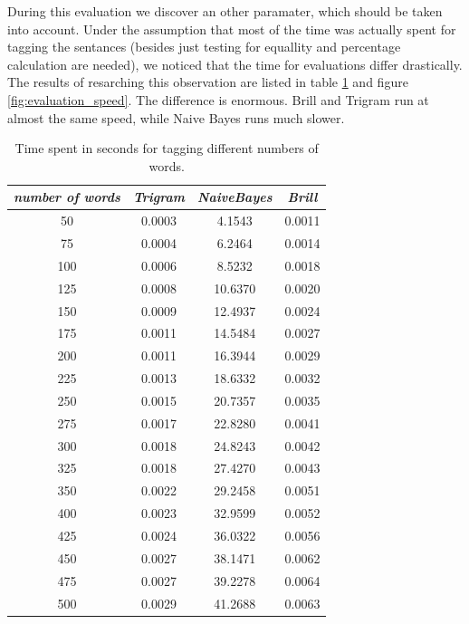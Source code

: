 \documentclass[10pt, conference, compsocconf]{IEEEtran}
\begin{document}
During this evaluation we discover an other paramater, which should be taken into account.
Under the assumption that most of the time was actually spent for tagging the sentances (besides just testing for equallity and percentage calculation are needed), we noticed that the time for evaluations differ drastically.
The results of resarching this observation are listed in table \ref{tab:evaluation_speed} and figure \ref{fig:evaluation_speed}. The difference is enormous. Brill and Trigram run at almost the same speed, while Naive Bayes runs much slower.

\begin{table}[htb]
\begin{center}
\begin{tabular}{c|c|c|c}
\textit{number of words} & \textit{Trigram} & \textit{NaiveBayes} & \textit{Brill} \\\hline\hline
   50  &  0.0003 &   4.1543  &  0.0011\\
   75  &  0.0004 &   6.2464  &  0.0014\\
  100  &  0.0006 &   8.5232  &  0.0018\\
  125  &  0.0008 &  10.6370  &  0.0020\\
  150  &  0.0009 &  12.4937  &  0.0024\\
  175  &  0.0011 &  14.5484  &  0.0027\\
  200  &  0.0011 &  16.3944  &  0.0029\\
  225  &  0.0013 &  18.6332  &  0.0032\\
  250  &  0.0015 &  20.7357  &  0.0035\\
  275  &  0.0017 &  22.8280  &  0.0041\\
  300  &  0.0018 &  24.8243  &  0.0042\\
  325  &  0.0018 &  27.4270  &  0.0043\\
  350  &  0.0022 &  29.2458  &  0.0051\\
  400  &  0.0023 &  32.9599  &  0.0052\\
  425  &  0.0024 &  36.0322  &  0.0056\\
  450  &  0.0027 &  38.1471  &  0.0062\\
  475  &  0.0027 &  39.2278  &  0.0064\\
  500  &  0.0029 &  41.2688  &  0.0063\\
\end{tabular}
\end{center}
\caption{Time spent in seconds for tagging different numbers of words.}
\label{tab:evaluation_speed}
\end{table}
\end{document}
